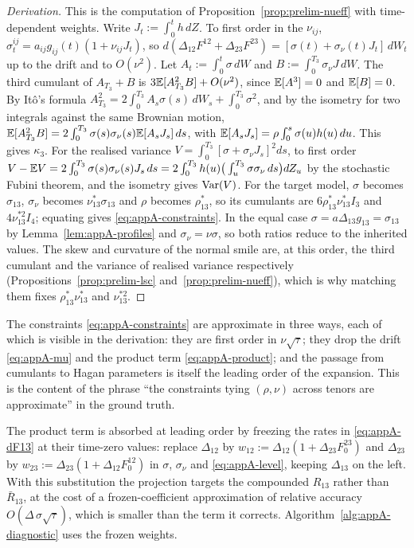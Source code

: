\documentclass[../../main.tex]{subfiles}
\begin{document}
\begin{proof}[Derivation]
This is the computation of Proposition~\ref{prop:prelim-nueff} with time-dependent weights. Write $J_t:=\int_0^th\,dZ$. To first order in the $\nu_{ij}$, $\sigma^{ij}_t=a_{ij}g_{ij}(t)(1+\nu_{ij}J_t)$, so $d(\Delta_{12}F^{12}+\Delta_{23}F^{23})=[\sigma(t)+\sigma_\nu(t)J_t]\,dW_t$ up to the drift and to $O(\nu^2)$. Let $A_t:=\int_0^t\sigma\,dW$ and $B:=\int_0^{T_3}\sigma_\nu J\,dW$. The third cumulant of $A_{T_3}+B$ is $3\mathbb{E}[A_{T_3}^2B]+O(\nu^2)$, since $\mathbb{E}[A^3]=0$ and $\mathbb{E}[B]=0$. By It\^o's formula $A_{T_3}^2=2\int_0^{T_3}A_s\sigma(s)\,dW_s+\int_0^{T_3}\sigma^2$, and by the isometry for two integrals against the same Brownian motion, $\mathbb{E}[A_{T_3}^2B]=2\int_0^{T_3}\sigma(s)\sigma_\nu(s)\mathbb{E}[A_sJ_s]\,ds$, with $\mathbb{E}[A_sJ_s]=\rho\int_0^s\sigma(u)h(u)\,du$. This gives $\kappa_3$. For the realised variance $V=\int_0^{T_3}[\sigma+\sigma_\nu J_s]^2ds$, to first order $V-\mathbb{E} V=2\int_0^{T_3}\sigma(s)\sigma_\nu(s)J_s\,ds=2\int_0^{T_3}h(u)\big(\int_u^{T_3}\sigma\sigma_\nu\,ds\big)dZ_u$ by the stochastic Fubini theorem, and the isometry gives $\operatorname{Var}(V)$. For the target model, $\sigma$ becomes $\sigma_{13}$, $\sigma_\nu$ becomes $\nu_{13}^*\sigma_{13}$ and $\rho$ becomes $\rho_{13}^*$, so its cumulants are $6\rho_{13}^*\nu_{13}^*I_3$ and $4\nu_{13}^{*2}I_4$; equating gives \eqref{eq:appA-constraints}. In the equal case $\sigma=a\Delta_{13}g_{13}=\sigma_{13}$ by Lemma~\ref{lem:appA-profiles} and $\sigma_\nu=\nu\sigma$, so both ratios reduce to the inherited values. The skew and curvature of the normal smile are, at this order, the third cumulant and the variance of realised variance respectively (Propositions~\ref{prop:prelim-lsc} and~\ref{prop:prelim-nueff}), which is why matching them fixes $\rho_{13}^*\nu_{13}^*$ and $\nu_{13}^{*2}$.
\end{proof}

The constraints \eqref{eq:appA-constraints} are approximate in three ways, each of which is visible in the derivation: they are first order in $\nu\sqrt\tau$; they drop the drift \eqref{eq:appA-mu} and the product term \eqref{eq:appA-product}; and the passage from cumulants to Hagan parameters is itself the leading order of the expansion. This is the content of the phrase ``the constraints tying $(\rho,\nu)$ across tenors are approximate'' in the ground truth.

\begin{remark}\label{rem:appA-frozen}
The product term is absorbed at leading order by freezing the rates in \eqref{eq:appA-dF13} at their time-zero values: replace $\Delta_{12}$ by $w_{12}:=\Delta_{12}(1+\Delta_{23}F^{23}_0)$ and $\Delta_{23}$ by $w_{23}:=\Delta_{23}(1+\Delta_{12}F^{12}_0)$ in $\sigma$, $\sigma_\nu$ and \eqref{eq:appA-level}, keeping $\Delta_{13}$ on the left. With this substitution the projection targets the compounded $R_{13}$ rather than $\bar R_{13}$, at the cost of a frozen-coefficient approximation of relative accuracy $O(\Delta\,\sigma\sqrt\tau)$, which is smaller than the term it corrects. Algorithm~\ref{alg:appA-diagnostic} uses the frozen weights.
\end{remark}
\end{document}
